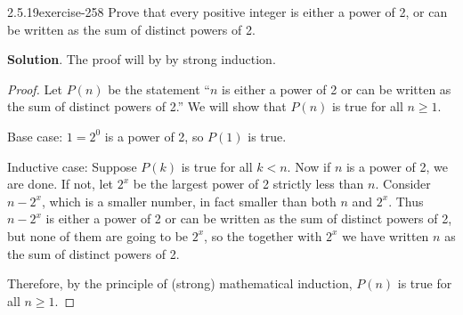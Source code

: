 \documentclass[twoside,11pt,]{book}
\numberwithin{equation}{chapter}
\newcommand{\lt}{<}
\begin{document}
\begin{divisionsolution}{2.5.19}{}{exercise-258}%
\hypertarget{p-3661}{}%
Prove that every positive integer is either a power of 2, or can be written as the sum of distinct powers of 2.%
\par\smallskip%
\noindent\textbf{Solution}.\quad%
\hypertarget{p-3662}{}%
The proof will by by strong induction.%
\begin{proof}{}
\hypertarget{p-3663}{}%
Let \(P(n)\) be the statement ``\(n\) is either a power of 2 or can be written as the sum of distinct powers of 2.'' We will show that \(P(n)\) is true for all \(n \ge 1\).%
\par
\hypertarget{p-3664}{}%
Base case: \(1 = 2^0\) is a power of 2, so \(P(1)\) is true.%
\par
\hypertarget{p-3665}{}%
Inductive case: Suppose \(P(k)\) is true for all \(k \lt n\). Now if \(n\) is a power of 2, we are done. If not, let \(2^x\) be the largest power of 2 strictly less than \(n\). Consider \(n - 2^x\), which is a smaller number, in fact smaller than both \(n\) and \(2^x\). Thus \(n-2^x\) is either a power of 2 or can be written as the sum of distinct powers of 2, but none of them are going to be \(2^x\), so the together with \(2^x\) we have written \(n\) as the sum of distinct powers of 2.%
\par
\hypertarget{p-3666}{}%
Therefore, by the principle of (strong) mathematical induction, \(P(n)\) is true for all \(n \ge 1\).%
\end{proof}
\end{divisionsolution}%
\end{document}
